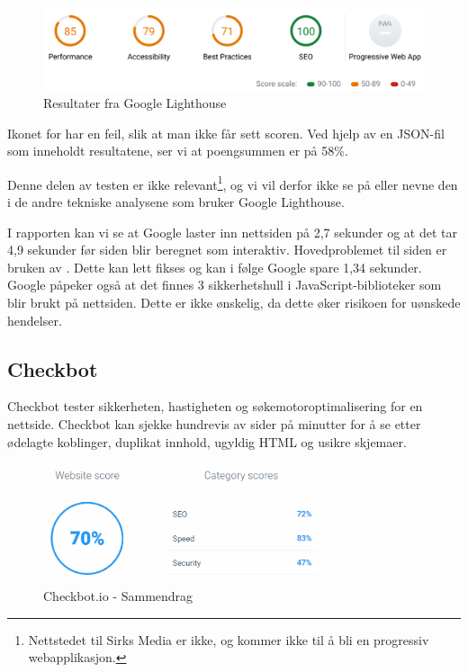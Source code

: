 \begin{figure}[H]
    \centering
    \includegraphics[width=\textwidth]{bjornar/Lighthouse-Report-mobile.png}
    \caption{Resultater fra Google Lighthouse}
    \label{fig:analysis-current-lightouse-summary}
\end{figure}

Ikonet for  har en feil, slik at man ikke får sett scoren. Ved hjelp av en JSON-fil som inneholdt resultatene, ser vi at poengsummen er på 58\%.

Denne delen av testen er ikke relevant\footnote{Nettstedet til Sirks Media er ikke, og kommer ikke til å bli en progressiv webapplikasjon.}, og vi vil derfor ikke se på eller nevne den i de andre tekniske analysene som bruker Google Lighthouse.

I rapporten kan vi se at Google laster inn nettsiden på 2,7 sekunder og at det tar 4,9 sekunder før siden blir beregnet som interaktiv. Hovedproblemet til siden er bruken av . Dette kan lett fikses og kan i følge Google spare 1,34 sekunder. Google påpeker også at det finnes 3 sikkerhetshull i JavaScript-biblioteker som blir brukt på nettsiden. Dette er ikke ønskelig, da dette øker risikoen for uønskede hendelser.

\subsection{Checkbot}
Checkbot \cite{checkbot2019cth} tester sikkerheten, hastigheten og søkemotoroptimalisering for en nettside. Checkbot kan sjekke hundrevis av sider på minutter for å se etter ødelagte koblinger, duplikat innhold, ugyldig HTML og usikre skjemaer.

\begin{figure}[H]
    \centering
    \includegraphics[width=0.75\textwidth]{bjornar/checkbotio-summary.png}
    \caption{Checkbot.io - Sammendrag}
    \label{fig:analysis-current-checkbot-summary}
\end{figure}

